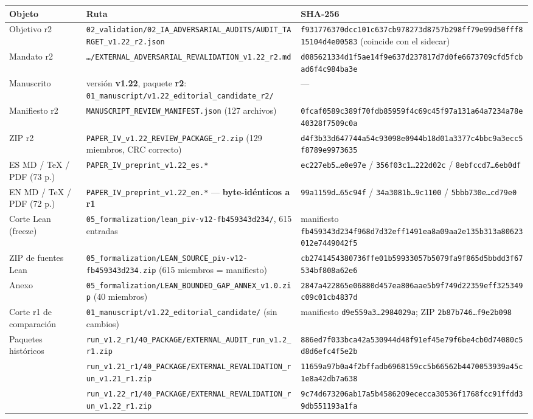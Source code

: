 \documentclass[
]{article}
\newcounter{none} %
\begin{document}
{\def\LTcaptype{none} %
\begin{longtable}[]{@{}lll@{}}
\toprule\noalign{}
Objeto & Ruta & SHA-256 \\
\midrule\noalign{}
\endhead
\bottomrule\noalign{}
\endlastfoot
Objetivo r2 &
\texttt{02\_validation/02\_IA\_ADVERSARIAL\_AUDITS/AUDIT\_TARGET\_v1.22\_r2.json}
&
\texttt{f931776370dcc101c637cb978273d8757b298ff79e99d50fff815104d4e00583}
(coincide con el sidecar) \\
Mandato r2 &
\texttt{…/EXTERNAL\_ADVERSARIAL\_REVALIDATION\_v1.22\_r2.md} &
\texttt{d085621334d1f5ae14f9e637d237817d7d0fe6673709cfd5fcbad6f4c984ba3e} \\
Manuscrito & versión \textbf{v1.22}, paquete \textbf{r2}:
\texttt{01\_manuscript/v1.22\_editorial\_candidate\_r2/} & --- \\
Manifiesto r2 & \texttt{MANUSCRIPT\_REVIEW\_MANIFEST.json} (127
archivos) &
\texttt{0fcaf0589c389f70fdb85959f4c69c45f97a131a64a7234a78e40328f7509c0a} \\
ZIP r2 & \texttt{PAPER\_IV\_v1.22\_REVIEW\_PACKAGE\_r2.zip} (129
miembros, CRC correcto) &
\texttt{d4f3b33d647744a54c93098e0944b18d01a3377c4bbc9a3ecc5f8789e9973635} \\
ES MD / TeX / PDF (73 p.) & \texttt{PAPER\_IV\_preprint\_v1.22\_es.*} &
\texttt{ec227eb5…e0e97e} / \texttt{356f03c1…222d02c} /
\texttt{8ebfccd7…6eb0df} \\
EN MD / TeX / PDF (72 p.) & \texttt{PAPER\_IV\_preprint\_v1.22\_en.*}
--- \textbf{byte-idénticos a r1} & \texttt{99a1159d…65c94f} /
\texttt{34a3081b…9c1100} / \texttt{5bbb730e…cd79e0} \\
Corte Lean (freeze) &
\texttt{05\_formalization/lean\_piv-v12-fb459343d234/}, 615 entradas &
manifiesto
\texttt{fb459343d234f968d7d32eff1491ea8a09aa2e135b313a80623012e7449042f5} \\
ZIP de fuentes Lean &
\texttt{05\_formalization/LEAN\_SOURCE\_piv-v12-fb459343d234.zip} (615
miembros = manifiesto) &
\texttt{cb2741454380736ffe01b59933057b5079fa9f865d5bbdd3f67534bf808a62e6} \\
Anexo & \texttt{05\_formalization/LEAN\_BOUNDED\_GAP\_ANNEX\_v1.0.zip}
(40 miembros) &
\texttt{2847a422865e06880d457ea806aae5b9f749d22359eff325349c09c01cb4837d} \\
Corte r1 de comparación &
\texttt{01\_manuscript/v1.22\_editorial\_candidate/} (sin cambios) &
manifiesto \texttt{d9e559a3…2984029a}; ZIP \texttt{2b87b746…f9e2b098} \\
Paquetes históricos &
\texttt{run\_v1.2\_r1/40\_PACKAGE/EXTERNAL\_AUDIT\_run\_v1.2\_r1.zip} &
\texttt{886ed7f033bca42a530944d48f91ef45e79f6be4cb0d74080c5d8d6efc4f5e2b} \\
&
\texttt{run\_v1.21\_r1/40\_PACKAGE/EXTERNAL\_REVALIDATION\_run\_v1.21\_r1.zip}
&
\texttt{11659a97b0a4f2bffadb6968159cc5b66562b4470053939a45c1e8a42db7a638} \\
&
\texttt{run\_v1.22\_r1/40\_PACKAGE/EXTERNAL\_REVALIDATION\_run\_v1.22\_r1.zip}
&
\texttt{9c74d673206ab17a5b4586209ececca30536f1768fcc91ffdd39db551193a1fa} \\
\end{longtable}
}
\end{document}
